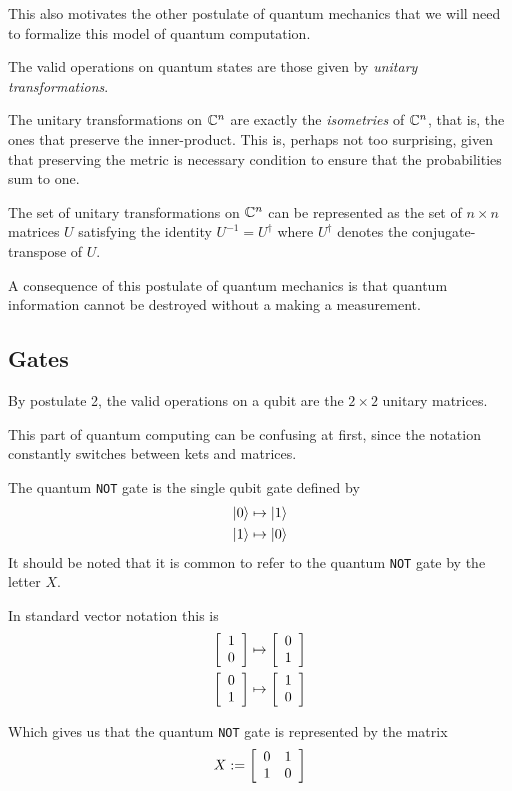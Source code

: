     This also motivates the other postulate of quantum mechanics that we will need to formalize this model of 
    quantum computation. 

    \begin{postulate}
        The valid operations on quantum states are those given by \emph{unitary transformations}.
    \end{postulate}

    The unitary transformations on $\mathbb{C}^n$ are exactly the \emph{isometries} of $\mathbb{C}^n$, that is, the ones that 
    preserve the inner-product. This is, perhaps not too surprising, given that preserving the metric is necessary 
    condition to ensure that the probabilities sum to one. 

    \begin{definition}
        The set of unitary transformations on $\mathbb{C}^n$ can be represented as the set of $n \times n$ matrices $U$ 
        satisfying the identity $U^{-1} = U^\dagger$ where $U^\dagger$ denotes the conjugate-transpose of $U$.
    \end{definition}

    A consequence of this postulate of quantum mechanics is that quantum information cannot be destroyed without a 
    making a measurement.

    
    
\subsection{Gates}
        
        By postulate 2, the valid operations on a qubit are the $2 \times 2$ unitary matrices.
        

        This part of quantum computing can be confusing at first, since the notation constantly switches between 
        kets and matrices.

        \begin{example}
            The quantum \texttt{NOT} gate is the single qubit gate defined by
            \begin{align*}
                \ket{0} &\mapsto \ket{1} \\
                \ket{1} &\mapsto \ket{0}
            \end{align*}
            It should be noted that it is common to refer to the quantum \texttt{NOT} gate by the letter $X$.

            In standard vector notation this is
            \begin{align*}
                \left[\begin{array}{r}1\\0\end{array}\right] &\mapsto \left[\begin{array}{r}0\\1\end{array}\right] \\
                \left[\begin{array}{r}0\\1\end{array}\right] &\mapsto \left[\begin{array}{r}1\\0\end{array}\right] 
            \end{align*}

            Which gives us that the quantum \texttt{NOT} gate is represented by the matrix
            \[
                X := \left[\begin{array}{rr}0&1\\1&0\end{array}\right]
            \]
        \end{example}

